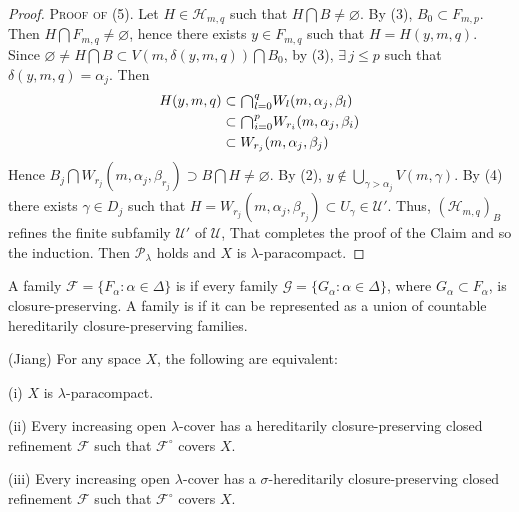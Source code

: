 \documentclass[jisng7iii.tex]{subfiles}
\begin{document}
\begin{proof}
\noindent\textsc{Proof of (5)}. Let $H\in \mathscr{H}_{m, q}$ such that  
$H\bigcap B \ne \varnothing$. 
By (3), $B_0\subset F_{m,p}$. Then $H\bigcap F_{m,q}\ne \varnothing$, hence there exists 
$y \in F_{m,q}$ such that $H= H(y, m, q)$. Since $\varnothing \ne H\bigcap B \subset
V(m, \delta(y, m, q)) \bigcap B_0$, by (3), 
$\exists \, j \le p$ such that  $\delta(y, m, q) = \alpha_j$.
Then
\begin{equation*}
	\begin{aligned}
H(y,m,q)  &\subset \raisebox{-2pt}{\scalebox{1.5}{$\cap$}}_{l=0}^q W_l(m, \alpha_j, \beta_l) \\
 & \subset \raisebox{-2pt}{\scalebox{1.5}{$\cap$}}_{i=0}^p W_{r_i}(m, \alpha_j, \beta_i) \\
 & \subset W_{r_j}(m, \alpha_j, \beta_j) 
	\end{aligned}
\end{equation*}
Hence $B_j \bigcap W_{r_j}(m, \alpha_j, \beta_{r_j}) \supset B \bigcap H \ne \varnothing$. By (2),
$y\notin\bigcup_{\gamma > \alpha_j}V(m,\gamma)$.
 By (4) there exists $\gamma\in D_j$ such that 
 $H = W_{r_j}(m, \alpha_j, \beta_{r_j}) \subset U_\gamma\in \mathscr{U}'$.
Thus, $(\mathscr{H}_{m,q})_B$ refines the finite subfamily $\mathscr{U}'$ of $\mathscr{U}$, 
That completes the proof of the Claim and so the induction. 
Then $\mathcal{P}_\lambda$ holds and $X$ is $\lambda$-paracompact.
\end{proof}

{  
 A family $\mathscr{F} = \{F_\alpha: \alpha \in \Delta\}$ is
if every family $\mathscr{G} = \{G_\alpha: \alpha \in \Delta\}$, where 
$G_\alpha\subset F_\alpha$, is closure-preserving.
A family is
if it can be represented as a union of  countable hereditarily closure-preserving 
families.
}

{\theorem{} \label{th:7.2.15}
\textup{(\hstretch{1.8}{[}Jiang\hstretch{1.8}{]})}
For any space $X$, the following are equivalent:

\textup{(i)}   $X$ is $\lambda$-paracompact.

 \textup{(ii)}  Every increasing open $\lambda$-cover has a hereditarily 
 closure-preserving closed refinement $\mathscr{F}$ such that $\mathscr{F}^\circ$ covers $X$.

\textup{(iii)}  Every increasing open $\lambda$-cover has a 
$\sigma$-hereditarily closure-preserving 
closed refinement $\mathscr{F}$ such that $\mathscr{F}^\circ$ covers $X$.
}
\end{document}
